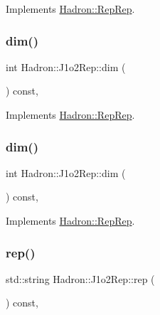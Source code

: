 Implements \mbox{\hyperlink{structHadron_1_1RepRep_a92c8802e5ed7afd7da43ccfd5b7cd92b}{Hadron\+::\+Rep\+Rep}}.

\mbox{\label{structHadron_1_1J1o2Rep_a2867fb4e13ae7883345606038d6b833b}} 
\subsubsection{\texorpdfstring{dim()}{dim()}\hspace{0.1cm}{\footnotesize\ttfamily [2/3]}}
{\footnotesize\ttfamily int Hadron\+::\+J1o2\+Rep\+::dim (\begin{DoxyParamCaption}{ }\end{DoxyParamCaption}) const\hspace{0.3cm}{\ttfamily [inline]}, {\ttfamily [virtual]}}



Implements \mbox{\hyperlink{structHadron_1_1RepRep_a92c8802e5ed7afd7da43ccfd5b7cd92b}{Hadron\+::\+Rep\+Rep}}.

\mbox{\label{structHadron_1_1J1o2Rep_a2867fb4e13ae7883345606038d6b833b}} 
\subsubsection{\texorpdfstring{dim()}{dim()}\hspace{0.1cm}{\footnotesize\ttfamily [3/3]}}
{\footnotesize\ttfamily int Hadron\+::\+J1o2\+Rep\+::dim (\begin{DoxyParamCaption}{ }\end{DoxyParamCaption}) const\hspace{0.3cm}{\ttfamily [inline]}, {\ttfamily [virtual]}}



Implements \mbox{\hyperlink{structHadron_1_1RepRep_a92c8802e5ed7afd7da43ccfd5b7cd92b}{Hadron\+::\+Rep\+Rep}}.

\mbox{\label{structHadron_1_1J1o2Rep_a4e049281173fb575d28821d31e36df00}} 
\subsubsection{\texorpdfstring{rep()}{rep()}\hspace{0.1cm}{\footnotesize\ttfamily [1/3]}}
{\footnotesize\ttfamily std\+::string Hadron\+::\+J1o2\+Rep\+::rep (\begin{DoxyParamCaption}{ }\end{DoxyParamCaption}) const\hspace{0.3cm}{\ttfamily [inline]}, {\ttfamily [virtual]}}



